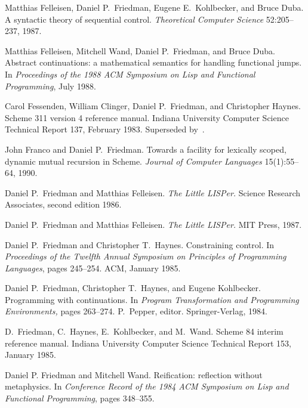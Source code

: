 \begin{thebibliography}{999}

Matthias Felleisen, Daniel P.~Friedman, Eugene E.~Kohlbecker, and Bruce Duba.
A syntactic theory of sequential control.
{\em Theoretical Computer Science} 52:205--237, 1987.

Matthias Felleisen, Mitchell Wand, Daniel P.~Friedman, and Bruce Duba.
Abstract continuations: a mathematical semantics for
  handling functional jumps.
In {\em Proceedings of the 1988 ACM Symposium on Lisp and
  Functional Programming},
   July 1988.


Carol Fessenden, William Clinger, Daniel P.~Friedman, and Christopher Haynes.
Scheme 311 version 4 reference manual.
Indiana University Computer Science Technical Report 137, February 1983.
Superseded by~\cite{Scheme84}.

John Franco and Daniel P.~Friedman.
Towards a facility for lexically scoped, dynamic mutual recursion
  in Scheme.
{\em Journal of Computer Languages} 15(1):55--64, 1990.

Daniel P.~Friedman and Matthias Felleisen.
{\em The Little LISPer.}
Science Research Associates, second edition 1986.

Daniel P.~Friedman and Matthias Felleisen.
{\em The Little LISPer.}
MIT Press, 1987.

Daniel P.~Friedman and Christopher T.~Haynes.
Constraining control.
In {\em Proceedings of the Twelfth Annual Symposium on Principles of
  Programming Languages}, pages 245--254.
ACM, January 1985.

Daniel P.~Friedman, Christopher T.~Haynes, and Eugene Kohlbecker.
Programming with continuations.
In {\em Program Transformation and Programming Environments,\/}
  pages 263--274.
P.~Pepper, editor.
Springer-Verlag, 1984.

D.~Friedman, C.~Haynes, E.~Kohlbecker, and M.~Wand.
Scheme 84 interim reference manual.
Indiana University Computer Science Technical Report 153, January 1985.

Daniel P. Friedman and Mitchell Wand.
Reification: reflection without metaphysics.
In {\em Conference Record of the 1984 ACM Symposium on Lisp
  and Functional Programming}, pages 348--355.


\end{thebibliography}
